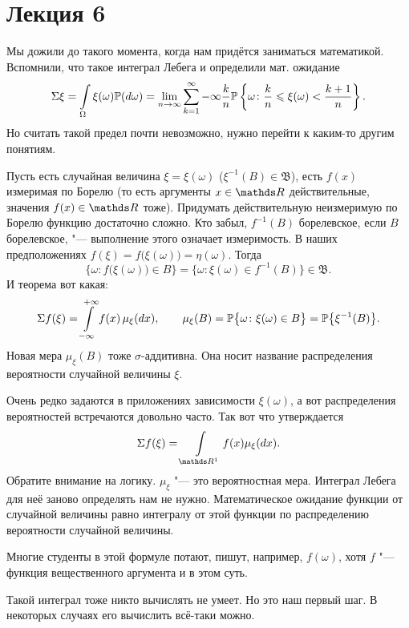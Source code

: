 \section{Лекция 6}
Мы дожили до такого момента, когда нам придётся заниматься математикой. Вспомнили, что такое интеграл Лебега и определили мат. ожидание
\[
  \Sigma\xi = \int\limits_\Omega \xi(\omega) \mathbb P(d\omega) = \lim\limits_{n\rightarrow\infty} \sum\limits_{{k}={1}}^\infty{-\infty} \frac{k}{n} \mathbb P\left\{ \omega\colon \frac kn\leqslant \xi(\omega) <\frac{k+1}n \right\}.
\]
Но считать такой предел почти невозможно, нужно перейти к каким-то другим понятиям.

Пусть есть случайная величина $\xi = \xi(\omega)$ ($\xi^{-1}(B)\in \mathfrak B$), есть $f(x)$ измеримая по Борелю (то есть аргументы $x\in\R$ действительные, значения $f(x)\in\R$ тоже). Придумать действительную неизмеримую по Борелю функцию достаточно сложно. Кто забыл, $f^{-1}(B)$ борелевское, если $B$ борелевское, "--- выполнение этого означает измеримость. В наших предположениях $f(\xi) = f\big(\xi(\omega)\big) = \eta(\omega)$. Тогда
\[
  \Big\{\omega\colon f\big(\xi(\omega)\big)\in B\Big\} = \big\{\omega\colon \xi(\omega)\in f^{-1} (B) \big\}\in \mathfrak B.
\]
И теорема вот какая:
\[
  \Sigma f(\xi) = \int\limits_{-\infty}^{+\infty} f(x)\,\mu_\xi(dx),\qquad
  \mu_\xi(B) = \mathbb P\big\{\omega\colon \xi(\omega)\in B\big\} = \mathbb P\big\{\xi^{-1}(B)\big\}.
\]
Новая мера $\mu_\xi(B)$ тоже $\sigma$-аддитивна. Она носит название распределения вероятности случайной величины $\xi$.

Очень редко задаются в приложениях зависимости $\xi(\omega)$, а вот распределения вероятностей встречаются довольно часто. Так вот что утверждается
\[
  \E f(\xi) = \int\limits_{\R^1} f(x)\mu_\xi(dx).
\]
Обратите внимание на логику. $\mu_\xi$ "--- это вероятностная мера. Интеграл Лебега для неё заново определять нам не нужно. Математическое ожидание функции от случайной величины равно интегралу от этой функции по распределению вероятности случайной величины.

Многие студенты в этой формуле потают, пишут, например, $f(\omega)$, хотя $f$ "--- функция вещественного аргумента и в этом суть.

Такой интеграл тоже никто вычислять не умеет. Но это наш первый шаг. В некоторых случаях его вычислить всё-таки можно.

